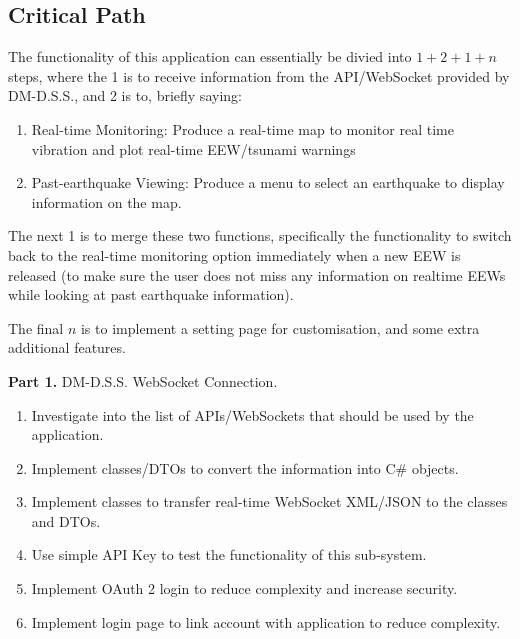 \documentclass[10pt]{article}
\begin{document}
\subsection{Critical Path}

The functionality of this application can essentially be divied into \(1+2+1+n\) steps, where the 1 is to receive information from the API/WebSocket provided by DM-D.S.S., and 2 is to, briefly saying:
\begin{enumerate}
    \item Real-time Monitoring: Produce a real-time map to monitor real time vibration and plot real-time EEW/tsunami warnings
    \item Past-earthquake Viewing: Produce a menu to select an earthquake to display information on the map.
\end{enumerate}

The next 1 is to merge these two functions, specifically the functionality to switch back to the real-time monitoring option immediately when a new EEW is released (to make sure the user does not miss any information on realtime EEWs while looking at past earthquake information).

The final \(n\) is to implement a setting page for customisation, and some extra additional features.

\bigskip

\textbf{Part 1.} DM-D.S.S. WebSocket Connection.
\begin{enumerate}
    \item Investigate into the list of APIs/WebSockets that should be used by the application.
    \item Implement classes/DTOs to convert the information into C\# objects.
    \item Implement classes to transfer real-time WebSocket XML/JSON to the classes and DTOs.
    \item Use simple API Key to test the functionality of this sub-system.
    \item Implement OAuth 2 login to reduce complexity and increase security.
    \item Implement login page to link account with application to reduce complexity.
\end{enumerate}
\end{document}
